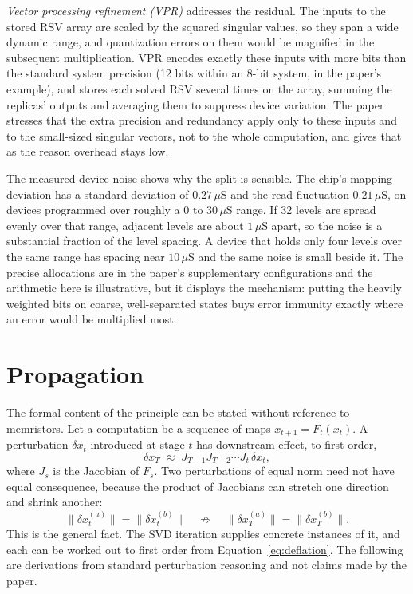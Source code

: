 \documentclass[11pt]{article}
\theoremstyle{definition}
\theoremstyle{remark}
\newcommand{\norm}[1]{\lVert #1\rVert}
\begin{document}
\emph{Vector processing refinement (VPR)} addresses the residual. The inputs to the stored RSV array are scaled by the squared singular values, so they span a wide dynamic range, and quantization errors on them would be magnified in the subsequent multiplication. VPR encodes exactly these inputs with more bits than the standard system precision (12 bits within an 8-bit system, in the paper's example), and stores each solved RSV several times on the array, summing the replicas' outputs and averaging them to suppress device variation. The paper stresses that the extra precision and redundancy apply only to these inputs and to the small-sized singular vectors, not to the whole computation, and gives that as the reason overhead stays low.

The measured device noise shows why the split is sensible. The chip's mapping deviation has a standard deviation of $0.27\,\mu$S and the read fluctuation $0.21\,\mu$S, on devices programmed over roughly a 0 to 30\,$\mu$S range. If 32 levels are spread evenly over that range, adjacent levels are about $1\,\mu$S apart, so the noise is a substantial fraction of the level spacing. A device that holds only four levels over the same range has spacing near $10\,\mu$S and the same noise is small beside it. The precise allocations are in the paper's supplementary configurations and the arithmetic here is illustrative, but it displays the mechanism: putting the heavily weighted bits on coarse, well-separated states buys error immunity exactly where an error would be multiplied most.

\section{Propagation}

The formal content of the principle can be stated without reference to memristors. Let a computation be a sequence of maps $x_{t+1}=F_t(x_t)$. A perturbation $\delta x_t$ introduced at stage $t$ has downstream effect, to first order,
\begin{equation}
  \delta x_T \;\approx\; J_{T-1}J_{T-2}\cdots J_t\,\delta x_t,
  \label{eq:jacobian}
\end{equation}
where $J_s$ is the Jacobian of $F_s$. Two perturbations of equal norm need not have equal consequence, because the product of Jacobians can stretch one direction and shrink another:
\[
  \norm{\delta x^{(a)}_t}=\norm{\delta x^{(b)}_t}
  \quad\not\Rightarrow\quad
  \norm{\delta x^{(a)}_T}=\norm{\delta x^{(b)}_T}.
\]
This is the general fact. The SVD iteration supplies concrete instances of it, and each can be worked out to first order from Equation~\eqref{eq:deflation}. The following are derivations from standard perturbation reasoning and not claims made by the paper.
\end{document}
